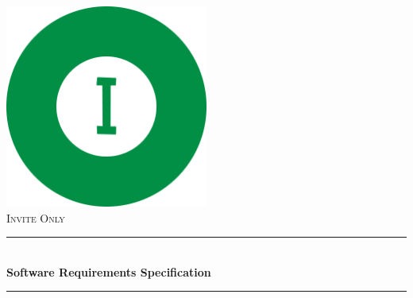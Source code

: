 \begin{titlepage}

\newcommand{\HRule}{\rule{\linewidth}{0.5mm}} %

\center %


\includegraphics[width=0.5\textwidth]{documentation/software_requirements_specification/title_page/logo.png}\\[1cm]
 


\textsc{\LARGE Invite Only}\\[1cm]


\HRule \\[0.4cm]
{ \huge \bfseries Software Requirements Specification}\\[0.4cm]
\HRule \\[1cm]
 


\end{titlepage}
